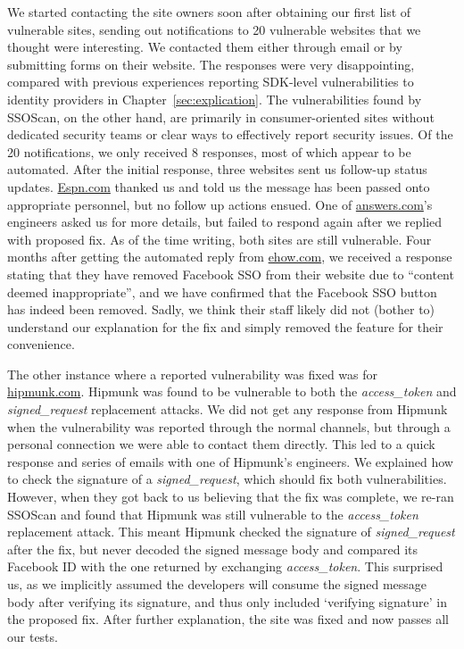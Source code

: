 We started contacting the site owners soon after obtaining our first list of vulnerable sites, sending out notifications to 20 vulnerable websites that we thought were interesting.  We contacted them either through email or by submitting forms on their website.  The responses were very disappointing, compared with previous experiences reporting SDK-level vulnerabilities to identity providers in Chapter~\ref{sec:explication}.  The vulnerabilities found by SSOScan, on the other hand, are primarily in consumer-oriented sites without dedicated security teams or clear ways to effectively report security issues.  Of the 20 notifications, we only received 8 responses, most of which appear to be automated.  After the initial response, three websites sent us follow-up status updates.  \url{Espn.com} thanked us and told us the message has been passed onto appropriate personnel, but no follow up actions ensued.  One of \url{answers.com}'s engineers asked us for more details, but failed to respond again after we replied with proposed fix.  As of the time writing, both sites are still vulnerable.  Four months after getting the automated reply from \url{ehow.com}, we received a response stating that they have removed Facebook SSO from their website due to ``content deemed inappropriate'', and we have confirmed that the Facebook SSO button has indeed been removed.  Sadly, we think their staff likely did not (bother to) understand our explanation for the fix and simply removed the feature for their convenience.

The other instance where a reported vulnerability was fixed was for \url{hipmunk.com}.  Hipmunk was found to be vulnerable to both the \emph{access\_token} and \emph{signed\_request} replacement attacks.  We did not get any response from Hipmunk when the vulnerability was reported through the normal channels, but through a personal connection we were able to contact them directly.  This led to a quick response and series of emails with one of Hipmunk's engineers.  We explained how to check the signature of a \emph{signed\_request}, which should fix both vulnerabilities.  However, when they got back to us believing that the fix was complete, we re-ran SSOScan and found that Hipmunk was still vulnerable to the \emph{access\_token} replacement attack.  This meant Hipmunk checked the signature of \emph{signed\_request} after the fix, but never decoded the signed message body and compared its Facebook ID with the one returned by exchanging \emph{access\_token}.  This surprised us, as we implicitly assumed the developers will consume the signed message body after verifying its signature, and thus only included `verifying signature' in the proposed fix.  After further explanation, the site was fixed and now passes all our tests.

